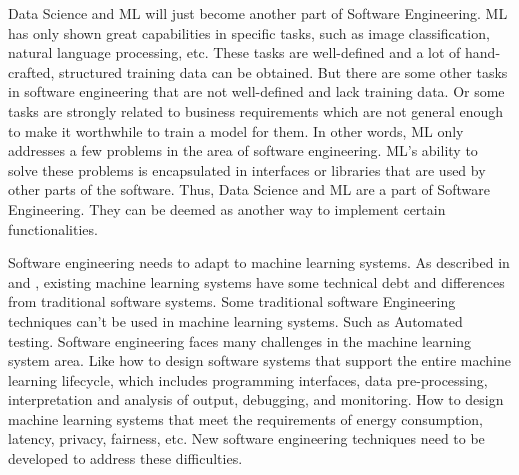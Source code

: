 \documentclass[11pt, a4paper]{article}
\begin{document}
Data Science and ML will just become another part of Software Engineering.
ML has only shown great capabilities in specific tasks, such as image classification,
natural language processing, etc.
These tasks are well-defined
and a lot of hand-crafted, structured training data can be obtained.
But there are some other tasks in software engineering that are not
well-defined and lack training data.
Or some tasks are strongly related to business requirements 
which are not general enough to make it worthwhile to train a model for them.
In other words, ML only addresses a few problems in the area of software engineering.
ML's ability to solve these problems is encapsulated in interfaces or libraries 
that are used by other parts of the software.
Thus, Data Science and ML are a part of Software Engineering.
They can be deemed as another way to implement certain functionalities.

Software engineering needs to adapt to machine learning systems.
As described in \cite{NIPS2015_86df7dcf} and \cite{AmershiMLEng},
existing machine learning systems have some technical debt
and differences from traditional software systems. 
Some traditional software Engineering techniques can't be used in machine learning systems.
Such as Automated testing.
Software engineering faces many challenges in the machine learning system area.
Like how to design software systems that support the entire machine learning lifecycle,
which includes programming interfaces, data pre-processing, interpretation and analysis of output, debugging, and monitoring.
How to design machine learning systems that meet the requirements of energy consumption,
latency, privacy, fairness, etc. 
New software engineering techniques need to be developed to address these difficulties.




\end{document}
